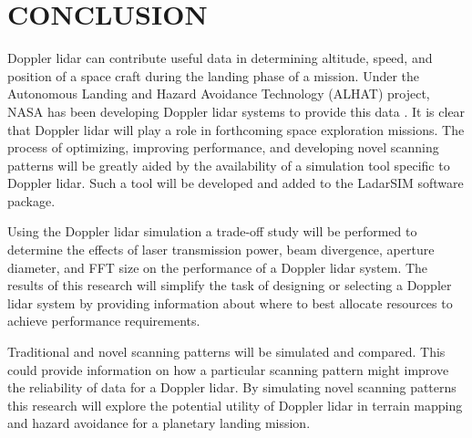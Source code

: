 \chapter{CONCLUSION}

Doppler lidar can contribute useful data in determining altitude, speed, 
and position of a space craft during the landing phase of a mission. Under the
Autonomous Landing and Hazard Avoidance Technology (ALHAT) project, NASA has 
been developing Doppler lidar systems to provide this data \cite{amz12fiber}. It is clear that
Doppler lidar will play a role in forthcoming space exploration missions. 
The process of optimizing, improving performance, and developing novel scanning patterns
will be greatly aided by the availability of a simulation tool specific to Doppler lidar. 
Such a tool will be developed and added to the LadarSIM software package. 

Using the Doppler lidar simulation a trade-off study will be performed to 
determine the effects of laser transmission power, beam divergence,
aperture diameter, and FFT size on the performance of a Doppler lidar system.
The results of this research will simplify the task of designing or selecting
a Doppler lidar system by providing information about where to best allocate
resources to achieve performance requirements. 

Traditional and novel scanning patterns will be simulated and compared. This could
provide information on how a particular scanning pattern might improve the reliability
of data for a Doppler lidar. By simulating novel scanning patterns this research will 
explore the potential utility of Doppler lidar in terrain mapping and hazard avoidance
for a planetary landing mission. 




